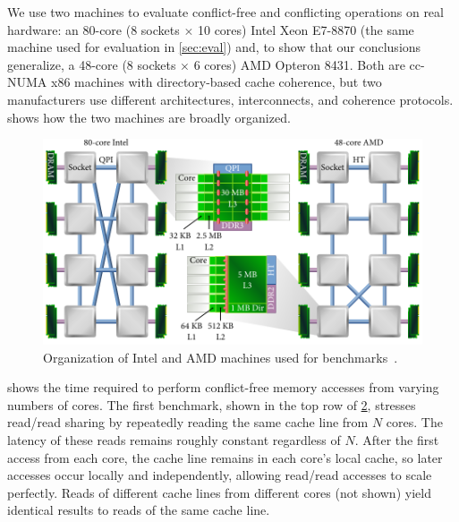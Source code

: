 We use two machines to evaluate conflict-free and conflicting
operations on real hardware: an 80-core (8 sockets $\times$ 10 cores)
Intel Xeon E7-8870 (the same machine used for evaluation in
\cref{sec:eval}) and, to show that our conclusions generalize, a
48-core (8 sockets $\times$ 6 cores) AMD Opteron 8431.
%
Both are cc-NUMA x86 machines with directory-based cache coherence,
but two manufacturers use different architectures, interconnects, and
coherence protocols.
%
 shows how the
two machines are broadly organized.

\begin{figure}
  \centering
  \includegraphics[width=\textwidth]{figures/machines.pdf}
  \caption[Organization of benchmark machines.]{Organization of Intel
    and AMD machines used for
    benchmarks~\cite{ben-motherboard,tom-motherboard-1,tom-motherboard-2}.}
  \label{fig:machines}
\end{figure}


\begin{figure}
  \centering
  \label{fig:cfree-cycles}
\end{figure}

 shows the time required to perform
conflict-free memory accesses from varying numbers of cores.  The
first benchmark, shown in the top row of \cref{fig:cfree-cycles},
stresses read/read sharing by repeatedly reading the same cache line
from $N$ cores.  The latency of these reads remains roughly constant
regardless of $N$.
After the first access from each core, the cache
line remains in each core's local cache, so later accesses occur
locally and independently, allowing read/read accesses to scale
perfectly.  Reads of different cache lines from different cores (not
shown) yield identical results to reads of the same cache line.

